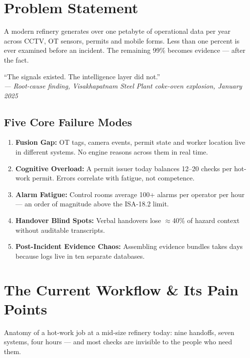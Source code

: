 \documentclass[11pt,a4paper]{article}
\begin{document}
\section{Problem Statement}
A modern refinery generates over one petabyte of operational data per year across CCTV, OT sensors, permits and mobile forms. Less than one percent is ever examined before an incident. The remaining 99\% becomes evidence — after the fact.

\begin{tcolorbox}[colback=LightMuted,colframe=NavyPrimary,arc=1mm,boxrule=0.5pt]
``The signals existed. The intelligence layer did not.''\\
\small\textit{— Root-cause finding, Visakhapatnam Steel Plant coke-oven explosion, January 2025}
\end{tcolorbox}

\subsection{Five Core Failure Modes}
\begin{enumerate}
    \item \textbf{Fusion Gap:} OT tags, camera events, permit state and worker location live in different systems. No engine reasons across them in real time.
    \item \textbf{Cognitive Overload:} A permit issuer today balances 12–20 checks per hot-work permit. Errors correlate with fatigue, not competence.
    \item \textbf{Alarm Fatigue:} Control rooms average 100+ alarms per operator per hour — an order of magnitude above the ISA-18.2 limit.
    \item \textbf{Handover Blind Spots:} Verbal handovers lose $\approx$40\% of hazard context without auditable transcripts.
    \item \textbf{Post-Incident Evidence Chaos:} Assembling evidence bundles takes days because logs live in ten separate databases.
\end{enumerate}

\section{The Current Workflow \& Its Pain Points}
Anatomy of a hot-work job at a mid-size refinery today: nine handoffs, seven systems, four hours — and most checks are invisible to the people who need them.

\end{document}
